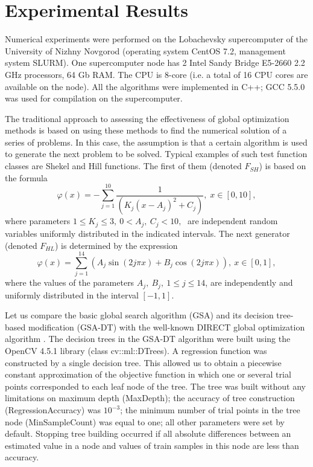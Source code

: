 \documentclass[entropy,article,submit,moreauthors,pdftex]{Definitions/mdpi}
\begin{document}
\section{Experimental Results}

Numerical experiments were performed on the Lobachevsky supercomputer of the University of Nizhny Novgorod (operating system CentOS 7.2, management system SLURM). One supercomputer node has 2 Intel Sandy Bridge E5-2660 2.2 GHz processors, 64 Gb RAM. The CPU is 8-core (i.e. a total of 16 CPU cores are available on the node). All the algorithms were implemented in C++; GCC 5.5.0 was used for compilation on the supercomputer.

The traditional approach to assessing the effectiveness of global optimization methods is based on using these methods to find the numerical solution of a series of problems. 
In this case, the assumption is that a certain algorithm is used to generate the next problem to be solved. 
Typical examples of such test function classes are Shekel and Hill functions. 
The first of them (denoted $F_{SH}$) is based on the formula
\begin{equation}\label{shekel}
  \varphi(x)=-\sum_{j=1}^{10}\frac{1}{(K_j(x-A_j)^2+C_j)},\;  x\in[0,10],
\end{equation}
where parameters $1\le K_j\le 3,\: 0 < A_j,\: C_j < 10, \;$ are independent random variables uniformly distributed in the indicated intervals. 
The next generator (denoted   $F_{HL}$) is determined by the expression
\begin{equation}\label{hill}
  \varphi(x)=\sum_{j=1}^{14}(A_j\sin(2j\pi x) + B_j\cos(2j\pi x)),\: x\in[0,1],
\end{equation}
where the values of the parameters $A_j,\: B_j,\: 1 \le j \le 14$, are independently and uniformly distributed in the interval  $[-1,1]$. 

Let us compare the basic global search algorithm (GSA) and its decision tree-based modification (GSA-DT) with the well-known DIRECT global optimization algorithm  \cite{Jones2009}.  
The decision trees in the GSA-DT algorithm were built using the OpenCV 4.5.1 library (class cv::ml::DTrees). A regression function was constructed by a single decision tree. This allowed us to obtain a piecewise constant approximation of the objective function in which one or several trial points corresponded to each leaf node of the tree. 
The tree was built without any limitations on maximum depth (MaxDepth); the accuracy of tree construction (RegressionAccuracy) was $10^{-3}$; the minimum number of trial points in the tree node (MinSampleCount) was equal to one; all other parameters were set by default. Stopping tree building occurred if all absolute differences between an estimated value in a node and values of train samples in this node are less than accuracy.
\end{document}
